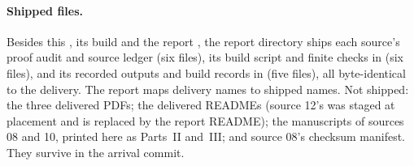 \documentclass[11pt,letterpaper]{article}
\theoremstyle{plain}
\theoremstyle{definition}
\theoremstyle{remark}
\numberwithin{equation}{section}
\begin{document}
\paragraph{Shipped files.} Besides this , its build
 and the report , the report directory ships each
source's proof audit and source ledger (six files), its build script and finite
checks in  (six files), and its recorded outputs and build records in
 (five files), all byte-identical to the delivery. The report
 maps delivery names to shipped names. Not shipped: the three
delivered PDFs; the delivered READMEs (source 12's was staged at placement and is
replaced by the report README); the manuscripts of sources 08 and 10, printed here as
Parts~II and~III; and source 08's checksum manifest. They survive in the arrival
commit.
\end{document}
